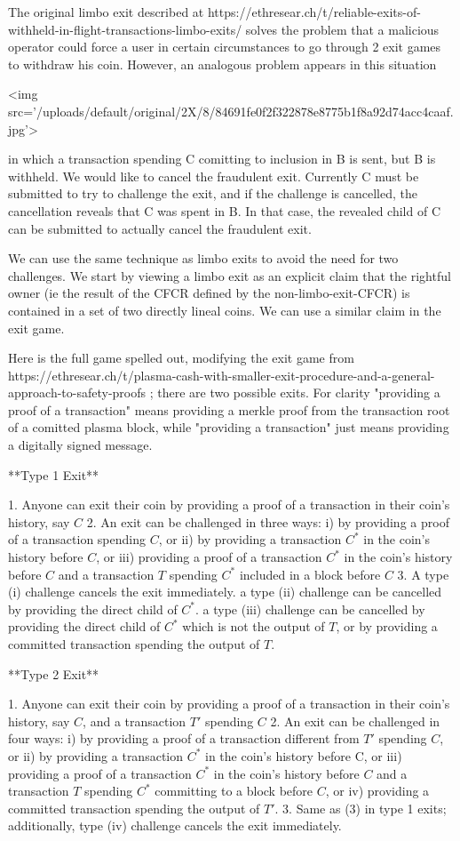 \documentclass{article}
\begin{document}
The original limbo exit described at https://ethresear.ch/t/reliable-exits-of-withheld-in-flight-transactions-limbo-exits/ solves the problem that a malicious operator could force a user in certain circumstances to go through 2 exit games to withdraw his coin. However, an analogous problem appears in this situation

<img src='/uploads/default/original/2X/8/84691fe0f2f322878e8775b1f8a92d74acc4caaf.jpg'>

in which a transaction spending C comitting to inclusion in B is sent, but B is withheld. We would like to cancel the fraudulent exit. Currently C must be submitted to try to challenge the exit, and if the challenge is cancelled, the cancellation reveals that C was spent in B. In that case, the revealed child of C can be submitted to actually cancel the fraudulent exit.

We can use the same technique as limbo exits to avoid the need for two challenges. We start by viewing a limbo exit as an explicit claim that the rightful owner (ie the result of the CFCR defined by the non-limbo-exit-CFCR) is contained in a set of two directly lineal coins. We can use a similar claim in the exit game.

Here is the full game spelled out, modifying the exit game from https://ethresear.ch/t/plasma-cash-with-smaller-exit-procedure-and-a-general-approach-to-safety-proofs ; there are two possible exits. For clarity "providing a proof of a transaction" means providing a merkle proof from the transaction root of a comitted plasma block, while "providing a transaction" just means providing a digitally signed message.

**Type 1 Exit**

1. Anyone can exit their coin by providing a proof of a transaction in their coin's history, say $C$
2. An exit can be challenged in three ways: i) by providing a proof of a transaction spending $C$, or ii) by providing a transaction $C^*$ in the coin's history before $C$, or iii) providing a proof of a transaction $C^*$ in the coin's history before $C$ and a transaction $T$ spending $C^*$ included in a block before $C$
3. A type (i) challenge cancels the exit immediately. a type (ii) challenge can be cancelled by providing the direct child of $C^*$. a type (iii) challenge can be cancelled by providing the direct child of $C^*$ which is not the output of $T$, or by providing a committed transaction spending the output of $T$.

**Type 2 Exit**

1. Anyone can exit their coin by providing a proof of a transaction in their coin's history, say $C$, and a transaction $T'$ spending $C$
2. An exit can be challenged in four ways: i) by providing a proof of a transaction different from $T'$ spending $C$, or ii) by providing a transaction $C^*$ in the coin's history before C, or iii) providing a proof of a transaction $C^*$ in the coin's history before $C$ and a transaction $T$ spending $C^*$ committing to a block before $C$, or iv) providing a committed transaction spending the output of $T'$.
3. Same as (3) in type 1 exits; additionally, type (iv) challenge cancels the exit immediately.
\end{document}
